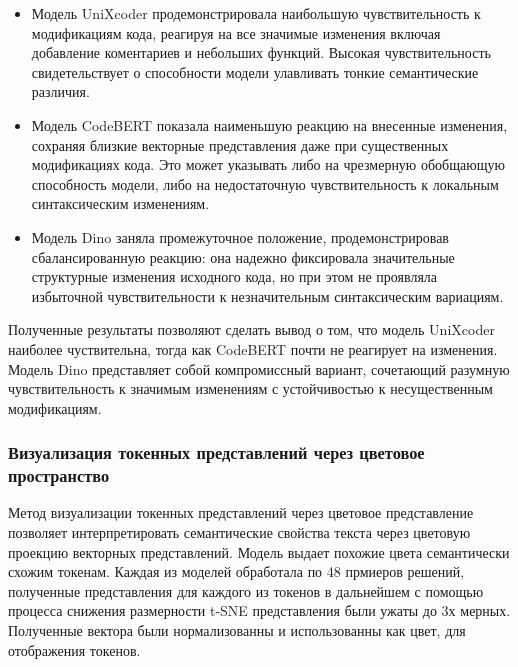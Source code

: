 \documentclass[../part_3.tex]{subfiles}
\begin{document}
\begin{itemize}
    \item Модель UniXcoder продемонстрировала наибольшую чувствительность к модификациям кода, реагируя на все значимые изменения включая добавление коментариев и небольших функций. Высокая чувствительность свидетельствует о способности модели улавливать тонкие семантические различия.

    \item Модель CodeBERT показала наименьшую реакцию на внесенные изменения, сохраняя близкие векторные представления даже при существенных модификациях кода. Это может указывать либо на чрезмерную обобщающую способность модели, либо на недостаточную чувствительность к локальным синтаксическим изменениям.

    \item Модель Dino заняла промежуточное положение, продемонстрировав сбалансированную реакцию: она надежно фиксировала значительные структурные изменения исходного кода, но при этом не проявляла избыточной чувствительности к незначительным синтаксическим вариациям.
\end{itemize}

\par Полученные результаты позволяют сделать вывод о том, что модель UniXcoder наиболее чуствительна, тогда как CodeBERT почти не реагирует на изменения. Модель Dino представляет собой компромиссный вариант, сочетающий разумную чувствительность к значимым изменениям с устойчивостью к несущественным модификациям.
\subsubsection{Визуализация токенных представлений через цветовое пространство}
\par Метод визуализации токенных представлений через цветовое представление позволяет интерпретировать семантические свойства текста через цветовую проекцию векторных представлений. Модель выдает похожие цвета семантически схожим токенам. Каждая из моделей обработала по 48 прмиеров решений, полученные представления для каждого из токенов в дальнейшем с помощью процесса снижения размерности t-SNE\cite{tsne} представления были ужаты до 3х мерных. Полученные вектора были нормализованны и использованны как цвет, для отображения токенов.
\end{document}
